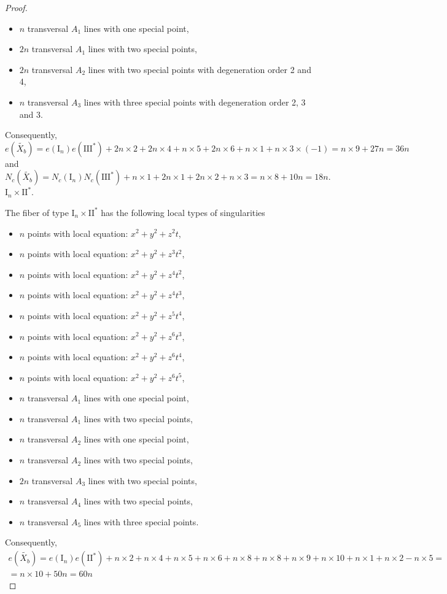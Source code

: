 \documentclass[a4paper]{amsart}
\theoremstyle{plain}
\theoremstyle{definition}
\theoremstyle{remark}
\numberwithin{equation}{section}
\begin{document}
\begin{proof}
\begin{itemize}
	\item [] $n$ transversal $A_{1}$ lines with one special point,
	\item [] $2n$ transversal $A_{1}$ lines with two special points,
	\item [] $2n$ transversal $A_{2}$ lines with two special points with degeneration order 2 and 4,
	\item [] $n$ transversal $A_{3}$ lines with three special points with degeneration order 2, 3 and 3.
\end{itemize}
Consequently,
\[
e(\widetilde{X_{b}}) = e(\mathrm{I}_n)e(\mathrm{III}^{*}) + 2n\times2 +2n \times 4 + n\times 5+2n\times 6 + n\times 1 +n\times 3\times (-1) =
n\times 9 + 27n = 36n
\]
and
\[
N_{c}(\widetilde{X_{b}}) = N_{c}(\mathrm{I}_{n})N_{c}(\mathrm{III}^{*}) +  n\times1 +  2n \times 1 +  2n \times 2 + n\times 3 = n\times 8+10n=18n.
\]
\medskip
\noindent\emph{$\mathrm{I}_n \times \mathrm{II}^*$}.

The fiber of type $\mathrm{I}_n \times \mathrm{II}^{*}$ has the following local types of singularities

\begin{itemize}
	\item [] $n$ points with local equation: $x^{2}+y^{2}+z^{2}t$,
	\item [] $n$ points with local equation: $x^{2}+y^{2}+z^{3}t^{2}$,
	\item [] $n$ points with local equation: $x^{2}+y^{2}+z^{4}t^{2}$,
	\item [] $n$ points with local equation: $x^{2}+y^{2}+z^{4}t^{3}$,
	\item [] $n$ points with local equation: $x^{2}+y^{2}+z^{5}t^{4}$,
	\item [] $n$ points with local equation: $x^{2}+y^{2}+z^{6}t^{3}$,
	\item [] $n$ points with local equation: $x^{2}+y^{2}+z^{6}t^{4}$,
	\item [] $n$ points with local equation: $x^{2}+y^{2}+z^{6}t^{5}$,
	\item [] $n$ transversal $A_{1}$ lines with one special point,
	\item [] $n$ transversal $A_{1}$ lines with two special points,
	\item [] $n$ transversal $A_{2}$ lines with one special point,
	\item [] $n$ transversal $A_{2}$ lines with two special points,
	\item [] $2n$ transversal $A_{3}$ lines with two special points,
	\item [] $n$ transversal $A_{4}$ lines with two special points,
	\item [] $n$ transversal $A_{5}$ lines with three special points.
\end{itemize}
Consequently,
\begin{multline*}
	e(\widetilde{X_{b}}) = e(\mathrm{I}_n)e(\mathrm{II}^{*}) + n\times2 +n\times 4 + n\times 5+n\times 6 + n\times 8 +n\times 8 + n\times 9 + n\times 10 + n\times 1 + n\times 2 - n \times 5 =\\
	=n\times 10 + 50n = 60n
\end{multline*}


\end{proof}
\end{document}
